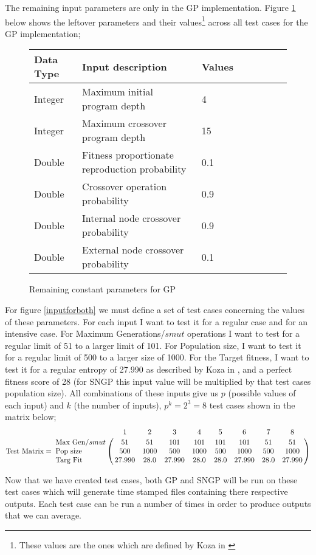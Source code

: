 \documentclass[a4paper,10.5pt]{article}
\begin{document}
The remaining input parameters are only in the GP implementation. Figure \ref{loparam} below shows the leftover parameters and their values\footnote{These values are the ones which are defined by Koza in \cite[p.41]{kozarng}} across all test cases for the GP implementation;
\begin{figure}[H]
\centering
\caption{Remaining constant parameters for GP}
\label{loparam}
\begin{tabular}{l*{6}{l}r}
Data Type             & Input description & Values\\
\hline
Integer & Maximum initial program depth & 4\\
Integer & Maximum crossover program depth & 15\\
Double & Fitness proportionate reproduction probability & 0.1\\
Double & Crossover operation probability & 0.9\\
Double & Internal node crossover probability & 0.9\\
Double & External node crossover probability & 0.1\\
\end{tabular}
\end{figure}

For figure \ref{inputforboth} we must define a set of test cases concerning the values of these parameters. For each input I want to test it for a regular case and for an intensive case. For Maximum Generations/$smut$ operations I want to test for a regular limit of 51 to a larger limit of 101. For Population size, I want to test it for a regular limit of 500 to a larger size of 1000. For the Target fitness, I want to test it for a regular entropy of 27.990 as described by Koza in \cite[p.41]{kozarng}, and a perfect fitness score of 28 (for SNGP this input value will be multiplied by that test cases population size). All combinations of these inputs give us $p$ (possible values of each input) and $k$ (the number of inputs), $p^k = 2^3 = 8$ test cases shown in the matrix below;
\begin{equation*}
\text{Test Matrix} = \bordermatrix{~ &  1&  2& 3& 4& 5 & 6 & 7 & 8\cr
                  $Max Gen/$smut& 51 & 51 & 101 & 101& 101 & 101 & 51 & 51   \cr
                  $Pop size$& 500 & 1000 & 500 & 1000 & 500 & 1000 & 500 & 1000  \cr
	       $Targ Fit$ & 27.990 & 28.0 & 27.990 & 28.0 & 28.0 & 27.990 & 28.0 & 27.990 \cr}
\end{equation*}

Now that we have created test cases, both GP and SNGP will be run on these test cases which will generate time stamped files containing there respective outputs. Each test case can be run a number of times in order to produce outputs that we can average. 
\end{document}
